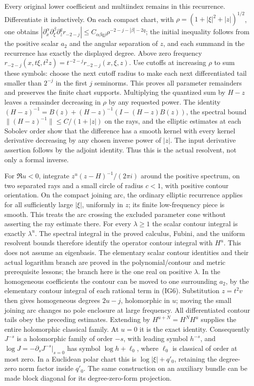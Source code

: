 \documentclass[
  11pt,
]{article}
\begin{document}
Every original lower coefficient and multiindex remains in this
recurrence. Differentiate it inductively. On each compact chart, with
\(\rho=(1+|\xi|^2+|z|)^{1/2}\), one obtains
\(|\partial_x^\alpha\partial_\xi^\beta\partial_z^q r_{-2-j}|\leq C_{\alpha\beta qj}\rho^{-2-j-|\beta|-2q}\);
the initial inequality follows from the positive scalar \(a_2\) and the
angular separation of \(z\), and each summand in the recurrence has
exactly the displayed degree. Above zero frequency
\(r_{-2-j}(x,t\xi,t^2z)=t^{-2-j}r_{-2-j}(x,\xi,z)\). Use cutoffs at
increasing \(\rho\) to sum these symbols: choose the next cutoff radius
to make each next differentiated tail smaller than \(2^{-j}\) in the
first \(j\) seminorms. This proves all parameter remainders and
preserves the finite chart supports. Multiplying the quantized sum by
\(H-z\) leaves a remainder decreasing in \(\rho\) by any requested
power. The identity \((H-z)^{-1}=B(z)+(H-z)^{-1}(I-(H-z)B(z))\), the
spectral bound \(\|(H-z)^{-1}\|\leq C/(1+|z|)\) on the rays, and the
elliptic estimates at each Sobolev order show that the difference has a
smooth kernel with every kernel derivative decreasing by any chosen
inverse power of \(|z|\). The input derivative assertion follows by the
adjoint identity. Thus this is the actual resolvent, not only a formal
inverse.

For \(\Re u<0\), integrate \(z^u(z-H)^{-1}/(2\pi i)\) around the
positive spectrum, on two separated rays and a small circle of radius
\(c<1\), with positive contour orientation. On the compact joining arc,
the ordinary elliptic recurrence applies for all sufficiently large
\(|\xi|\), uniformly in \(z\); its finite low-frequency piece is smooth.
This treats the arc crossing the excluded parameter cone without
asserting the ray estimate there. For every \(\lambda\geq1\) the scalar
contour integral is exactly \(\lambda^u\). The spectral integral in the
proved calculus, Fubini, and the uniform resolvent bounds therefore
identify the operator contour integral with \(H^u\). This does not
assume an eigenbasis. The elementary scalar contour identities and their
actual logarithm branch are proved in the polynomial/contour and metric
prerequisite lessons; the branch here is the one real on positive
\(\lambda\). In the homogeneous coefficients the contour can be moved to
one surrounding \(a_2\), by the elementary contour integral of each
rational term in (IG6). Substitution \(z=t^2v\) then gives homogeneous
degrees \(2u-j\), holomorphic in \(u\); moving the small joining arc
changes no pole enclosure at large frequency. All differentiated contour
tails obey the preceding estimates. Extending by \(H^{u+N}=H^NH^u\)
supplies the entire holomorphic classical family. At \(u=0\) it is the
exact identity. Consequently \(J^{-s}\) is a holomorphic family of order
\(-s\), with leading symbol \(h^{-s}\), and
\(\log J=-\partial_sJ^{-s}|_{s=0}\) has symbol \(\log h+\ell_0\), where
\(\ell_0\) is classical of order at most zero. In a Euclidean polar
chart this is \(\log|\xi|+q'_0\), retaining the degree-zero norm factor
inside \(q'_0\). The same construction on an auxiliary bundle can be
made block diagonal for its degree-zero-form projection.
\end{document}
